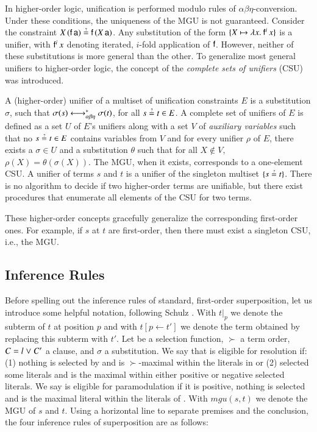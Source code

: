 In higher-order logic, unification is performed modulo rules of
$\alpha\beta\eta$-conversion. Under these conditions, the uniqueness of the MGU is not guaranteed. Consider the constraint $X \,
(\cst{f} \, \cst{a}) \unif \cst{f} \, (X \, \cst{a})$. Any substitution of the
form $\{ X \mapsto \lambda x.\> \mathsf{f}^i \, x \}$ is a unifier, with $\mathsf{f}^i \, x$
denoting iterated, $i$-fold application of $\mathsf{f}$. However, neither of these substitutions
is more general than the other. To generalize most general
unifiers to higher-order logic, the concept of the {\em complete sets of unifiers} (CSU) was
introduced.

A (higher-order) unifier of a multiset of unification constraints $E$ is
a substitution $\sigma$, such that $\sigma(s) \longleftrightarrow^*_{\alpha\beta\eta} \sigma(t)$, for all $s \unif t
\in E$. A complete set of unifiers of $E$ is defined as a
set $U$ of $E$'s unifiers along with a set $V$ of \emph{auxiliary variables}
such that no $s \unif t \in E$ contains variables from $V$ and for every unifier
$\rho$ of $E$, there exists a $\sigma \in U$ and a substitution $\theta$ such
that for all $X\not\in V,$ $\rho(X) = \theta(\sigma(X))$. The MGU,
when it exists, corresponds to a one-element CSU. A unifier of terms $s$ and $t$ is a unifier of
the singleton multiset $\{ s \unif t \}$. There is no algorithm to decide
if two higher-order terms are unifiable, but there exist procedures
that enumerate all elements of the CSU for two terms.

These higher-order concepts gracefully generalize the corresponding first-order
ones. For example, if $s$ at $t$ are first-order, then there must exist a singleton
CSU, i.e., the MGU. 

\subsection{Inference Rules}
\label{sec:pre:rules}
\newcommand{\mgu}{\ensuremath{\mathit{mgu}}}

Before spelling out the inference rules of standard, first-order superposition,
let us introduce some helpful notation, following Schulz \cite{ss-02-brainiac}.
With $t|_p$ we denote the subterm of $t$ at position $p$ and with $t[p \leftarrow
t']$  we denote the term obtained by replacing this subterm with $t'$. Let \selfun{} be a selection function,
$\succ$ a term order, $C = l \mathrel\lor C'$ a clause, and $\sigma$ a
substitution. We say that  is eligible for resolution if: (1) nothing
is selected by \selfun{} and  is $\succ$-maximal within the literals in
 or (2) \selfun{} selected some literals and  is the maximal
within either positive or negative selected literals. We say  is
eligible for paramodulation if it is positive, nothing is selected and
 is the maximal literal within the literals of .  With
$\mgu(s,t)$ we denote the MGU of $s$ and $t$. Using a horizontal
line to separate premises and the conclusion, the four inference rules of
superposition are as follows:

